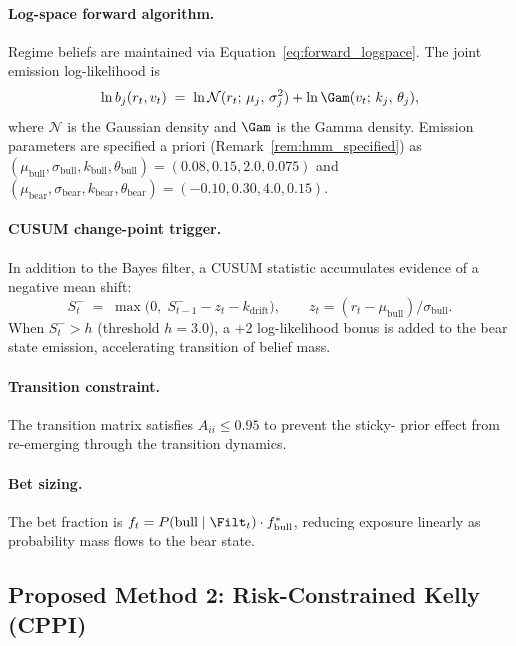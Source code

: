 \paragraph{Log-space forward algorithm.}
Regime beliefs are maintained via Equation~\eqref{eq:forward_logspace}.
The joint emission log-likelihood is
\begin{equation}
    \ln b_j(r_t, v_t) \;=\;
    \ln \mathcal{N}(r_t;\,\mu_j,\,\sigma_j^2)
    + \ln \Gam(v_t;\,k_j,\,\theta_j),
    \label{eq:vol_hmm_emission}
\end{equation}
where $\mathcal{N}$ is the Gaussian density and $\Gam$ is the Gamma density.
Emission parameters are specified a priori (Remark~\ref{rem:hmm_specified})
as $(\mu_{\text{bull}}, \sigma_{\text{bull}}, k_{\text{bull}},
\theta_{\text{bull}}) = (0.08, 0.15, 2.0, 0.075)$ and
$(\mu_{\text{bear}}, \sigma_{\text{bear}}, k_{\text{bear}},
\theta_{\text{bear}}) = (-0.10, 0.30, 4.0, 0.15)$.

\paragraph{CUSUM change-point trigger.}
In addition to the Bayes filter, a CUSUM statistic accumulates evidence of
a negative mean shift:
\begin{equation}
    S_t^- \;=\; \max\!\bigl(0,\; S_{t-1}^- - z_t - k_{\text{drift}}\bigr),
    \qquad z_t = (r_t - \mu_{\text{bull}}) / \sigma_{\text{bull}}.
    \label{eq:cusum}
\end{equation}
When $S_t^- > h$ (threshold $h = 3.0$), a +2 log-likelihood bonus is added
to the bear state emission, accelerating transition of belief mass.

\paragraph{Transition constraint.}
The transition matrix satisfies $A_{ii} \leq 0.95$ to prevent the sticky-
prior effect from re-emerging through the transition dynamics.

\paragraph{Bet sizing.}
The bet fraction is $f_t = P(\text{bull} \mid \Filt_t) \cdot f^*_{\text{bull}}$,
reducing exposure linearly as probability mass flows to the bear state.

\subsection{Proposed Method 2: Risk-Constrained Kelly (CPPI)}

